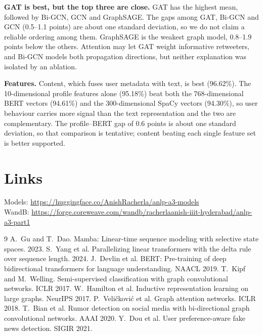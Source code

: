 \documentclass[12pt,a4paper]{article}
\begin{document}
\textbf{GAT is best, but the top three are close.} GAT has the highest mean, followed by Bi-GCN, GCN and GraphSAGE. The gaps among GAT, Bi-GCN and GCN (0.5--1.1 points) are about one standard deviation, so we do not claim a reliable ordering among them. GraphSAGE is the weakest graph model, 0.8--1.9 points below the others. Attention may let GAT weight informative retweeters, and Bi-GCN models both propagation directions, but neither explanation was isolated by an ablation.

\textbf{Features.} Content, which fuses user metadata with text, is best (96.62\%). The 10-dimensional profile features alone (95.18\%) beat both the 768-dimensional BERT vectors (94.61\%) and the 300-dimensional SpaCy vectors (94.30\%), so user behaviour carries more signal than the text representation and the two are complementary. The profile--BERT gap of 0.6 points is about one standard deviation, so that comparison is tentative; content beating each single feature set is better supported.

\section*{Links}
Models: \url{https://huggingface.co/AnishRacherla/anlp-a3-models}\\
WandB: \url{https://forge.coreweave.com/wandb/racherlaanish-iiit-hyderabad/anlp-a3-part1}

\begin{thebibliography}{9}
\small
{} A.~Gu and T.~Dao. Mamba: Linear-time sequence modeling with selective state spaces. 2023.
 S.~Yang et al. Parallelizing linear transformers with the delta rule over sequence length. 2024.
 J.~Devlin et al. BERT: Pre-training of deep bidirectional transformers for language understanding. NAACL 2019.
 T.~Kipf and M.~Welling. Semi-supervised classification with graph convolutional networks. ICLR 2017.
 W.~Hamilton et al. Inductive representation learning on large graphs. NeurIPS 2017.
 P.~Veli\v{c}kovi\'{c} et al. Graph attention networks. ICLR 2018.
 T.~Bian et al. Rumor detection on social media with bi-directional graph convolutional networks. AAAI 2020.
 Y.~Dou et al. User preference-aware fake news detection. SIGIR 2021.
\end{thebibliography}
\end{document}
